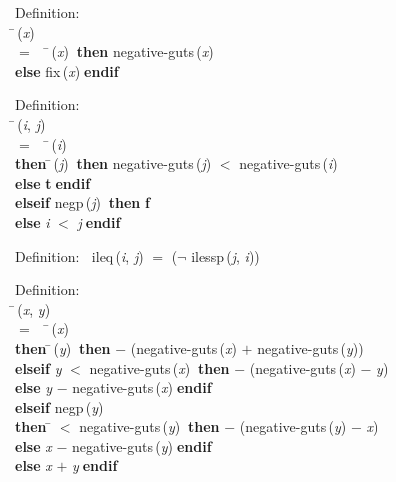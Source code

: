\begin{tabbing}{\sc Definition}: \\  
\=\,({\it{x\/}}) \\ 
$=$$\;\;\;\;$\=\,({\it{x\/}})$\;\;${\bf then }{\rm{negative-guts}}\,({\it{x\/}}) \\ 
{\bf else }{\rm{fix}}\,({\it{x\/}})$\;${\bf  endif}\-\-
\end{tabbing}

\begin{tabbing}{\sc Definition}: \\  
\=\,({\it{i\/}}, {\it{j\/}}) \\ 
$=$$\;\;\;\;$\=\,({\it{i\/}}) \\ 
{\bf then }\=\,({\it{j\/}})$\;\;${\bf then }{\rm{negative-guts}}\,({\it{j\/}}) $<$ {\rm{negative-guts}}\,({\it{i\/}}) \\ 
{\bf else }{\bf{t}}$\;${\bf  endif}\- \\ 
{\bf elseif }{\rm{negp}}\,({\it{j\/}})$\;\;${\bf then }{\bf{f}} \\ 
{\bf else }{\it{i\/}} $<$ {\it{j\/}}$\;${\bf  endif}\-\-
\end{tabbing}

\begin{tabbing}{\sc Definition}:$\;\;$
{\rm{ileq}}\,({\it{i\/}}, {\it{j\/}}) $=$ ($\neg$ {\rm{ilessp}}\,({\it{j\/}}, {\it{i\/}}))
\end{tabbing}

\begin{tabbing}{\sc Definition}: \\  
\=\,({\it{x\/}}, {\it{y\/}}) \\ 
$=$$\;\;\;\;$\=\,({\it{x\/}}) \\ 
{\bf then }\=\,({\it{y\/}})$\;\;${\bf then }$-$ ({\rm{negative-guts}}\,({\it{x\/}}) $+$ {\rm{negative-guts}}\,({\it{y\/}})) \\ 
{\bf elseif }{\it{y\/}} $<$ {\rm{negative-guts}}\,({\it{x\/}})$\;\;${\bf then }$-$ ({\rm{negative-guts}}\,({\it{x\/}}) $-$ {\it{y\/}}) \\ 
{\bf else }{\it{y\/}} $-$ {\rm{negative-guts}}\,({\it{x\/}})$\;${\bf  endif}\- \\ 
{\bf elseif }{\rm{negp}}\,({\it{y\/}}) \\ 
{\bf then }\= $<$ {\rm{negative-guts}}\,({\it{y\/}})$\;\;${\bf then }$-$ ({\rm{negative-guts}}\,({\it{y\/}}) $-$ {\it{x\/}}) \\ 
{\bf else }{\it{x\/}} $-$ {\rm{negative-guts}}\,({\it{y\/}})$\;${\bf  endif}\- \\ 
{\bf else }{\it{x\/}} $+$ {\it{y\/}}$\;${\bf  endif}\-\-
\end{tabbing}

